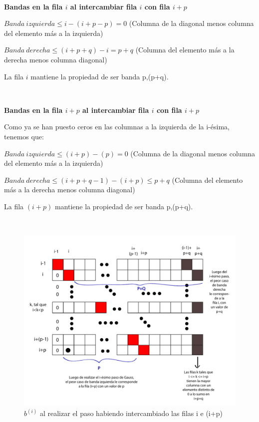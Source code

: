 ~

\textbf{Bandas en la fila $i$ al intercambiar fila $i$ con fila $i+p$}

$Banda \ izquierda \leq i - (i+p-p) = 0$ (Columna de la diagonal menos columna del elemento más a la izquierda)

$Banda \ derecha \leq (i+p+q) - i = p+q$ (Columna del elemento más a la derecha menos columna diagonal)

La fila $i$ mantiene la propiedad de ser banda p,(p+q).

~

\textbf{Bandas en la fila $i+p$ al intercambiar fila $i$ con fila $i+p$}

Como ya se han puesto ceros en las columnas a la izquierda de la i-ésima, tenemos que:

$Banda \ izquierda \leq (i+p) - (p) = 0$ (Columna de la diagonal menos columna del elemento más a la izquierda)

$Banda \ derecha \leq (i+p+q-1) - (i+p) \leq p+q$ (Columna del elemento más a la derecha menos columna diagonal)

La fila $(i+p)$ mantiene la propiedad de ser banda p,(p+q).

~

\begin{figure}[!h]
	\begin{center}
		  \includegraphics[scale=0.5]{Imagenes/im_10.pdf}
		  \caption{$b^{(i)}$ al realizar el paso habiendo intercambiado las filas i e (i+p)}
		  \label{fig:contra1}
	\end{center}
\end{figure}

